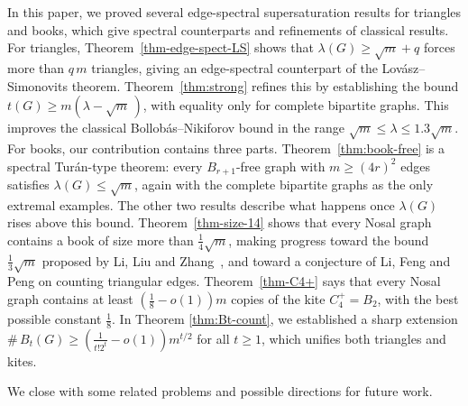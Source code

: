 \documentclass[11pt,a4paper]{article}
\theoremstyle{definition}
\theoremstyle{plain}
\renewcommand{\le}{\leqslant}
\renewcommand{\ge}{\geqslant}
\begin{document}
In this paper, we proved several edge-spectral supersaturation results for triangles and books, which give spectral counterparts and refinements of classical  results. 
For triangles, Theorem~\ref{thm-edge-spect-LS} shows 
that $\lambda(G)\ge\sqrt{m} + q$ forces more
than $q\, m$ triangles, giving an edge-spectral counterpart of the Lov\'asz--Simonovits theorem. Theorem~\ref{thm:strong} refines this by establishing the bound $t(G)\ge m(\lambda-\sqrt{m}\,)$, with equality only for complete bipartite graphs. 
This improves the classical Bollob\'{a}s--Nikiforov bound \cite{BollobasNikiforov2007} in the range $\sqrt{m} \le \lambda \le  1.3\sqrt{m}$.  
For books, our contribution contains three parts. Theorem~\ref{thm:book-free} is a
spectral Tur\'an-type theorem: every $B_{r+1}$-free graph with $m\ge(4r)^2$ edges
satisfies $\lambda(G)\le\sqrt{m}$, again with the complete bipartite graphs as
the only extremal examples. 
The other two results describe what happens once
$\lambda(G)$ rises above this bound. 
Theorem~\ref{thm-size-14} shows that every Nosal graph contains a book of size more than $\tfrac14\sqrt{m}$, making progress toward the   bound $\tfrac13\sqrt{m}$ proposed by Li, Liu and Zhang~\cite{LiLiuZhang26}, and toward a conjecture of Li, Feng and Peng \cite{LFP2024-triangular} on counting triangular edges. 
Theorem~\ref{thm-C4+} says that every Nosal graph contains at least
$(\tfrac18-o(1))m$ copies of the kite $C_4^+=B_2$, with the best possible constant $\tfrac18$. 
In Theorem \ref{thm:Bt-count}, 
we established a sharp extension $\texttt{\#}\, B_t(G) \ge (\frac{1}{t!2^t} - o(1))m^{t/2}$ for all $t\ge 1$, which unifies both triangles and kites.    

\medskip 
We close with some related problems and possible directions for future work. 

\vspace{-3mm}
\end{document}
